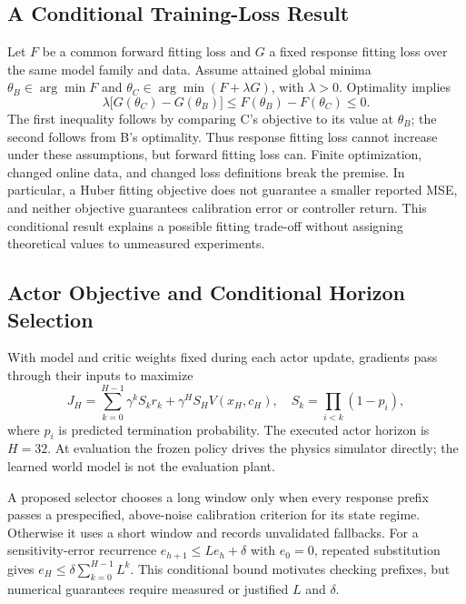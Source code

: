 \subsection{A Conditional Training-Loss Result}
Let $F$ be a common forward fitting loss and $G$ a fixed response fitting loss over the same model family and data. Assume attained global minima $\theta_B\in\arg\min F$ and $\theta_C\in\arg\min(F+\lambda G)$, with $\lambda>0$. Optimality implies
\begin{equation}
\lambda\bigl[G(\theta_C)-G(\theta_B)\bigr]
\le F(\theta_B)-F(\theta_C)\le0.
\label{eq:optimality}
\end{equation}
The first inequality follows by comparing C's objective to its value at $\theta_B$; the second follows from B's optimality. Thus response fitting loss cannot increase under these assumptions, but forward fitting loss can. Finite optimization, changed online data, and changed loss definitions break the premise. In particular, a Huber fitting objective does not guarantee a smaller reported MSE, and neither objective guarantees calibration error or controller return. This conditional result explains a possible fitting trade-off without assigning theoretical values to unmeasured experiments.

\subsection{Actor Objective and Conditional Horizon Selection}
With model and critic weights fixed during each actor update, gradients pass through their inputs to maximize
\begin{equation}
J_H=\sum_{k=0}^{H-1}\gamma^k S_k r_k
     +\gamma^H S_H V(x_H,c_H),\quad
S_k=\prod_{i<k}(1-p_i),
\label{eq:actor}
\end{equation}
where $p_i$ is predicted termination probability. The executed actor horizon is $H=32$. At evaluation the frozen policy drives the physics simulator directly; the learned world model is not the evaluation plant.

A proposed selector chooses a long window only when every response prefix passes a prespecified, above-noise calibration criterion for its state regime. Otherwise it uses a short window and records unvalidated fallbacks. For a sensitivity-error recurrence $e_{h+1}\le L e_h+\delta$ with $e_0=0$, repeated substitution gives $e_H\le\delta\sum_{k=0}^{H-1}L^k$. This conditional bound motivates checking prefixes, but numerical guarantees require measured or justified $L$ and $\delta$.

